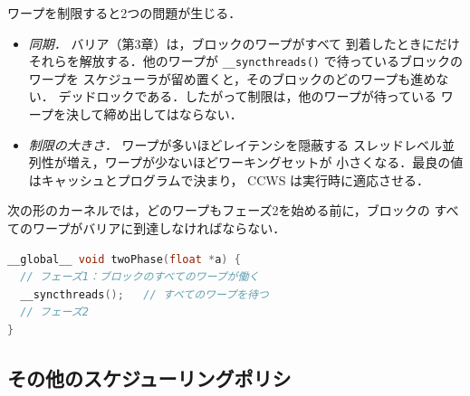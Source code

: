 \documentclass[../main.tex]{subfiles}
\begin{document}
ワープを制限すると2つの問題が生じる．
\begin{itemize}
  \item \emph{同期．}  バリア（第3章）は，ブロックのワープがすべて
    到着したときにだけそれらを解放する．他のワープが
    \texttt{\_\_syncthreads()} で待っているブロックのワープを
    スケジューラが留め置くと，そのブロックのどのワープも進めない．
    デッドロックである．したがって制限は，他のワープが待っている
    ワープを決して締め出してはならない．
  \item \emph{制限の大きさ．}  ワープが多いほどレイテンシを隠蔽する
    スレッドレベル並列性が増え，ワープが少ないほどワーキングセットが
    小さくなる．最良の値はキャッシュとプログラムで決まり，
    CCWS は実行時に適応させる．
\end{itemize}
次の形のカーネルでは，どのワープもフェーズ2を始める前に，ブロックの
すべてのワープがバリアに到達しなければならない．

\begin{lstlisting}[language=C++, numbers=none]
__global__ void twoPhase(float *a) {
  // フェーズ1：ブロックのすべてのワープが働く
  __syncthreads();   // すべてのワープを待つ
  // フェーズ2
}
\end{lstlisting}

\subsection{その他のスケジューリングポリシ}
\end{document}
